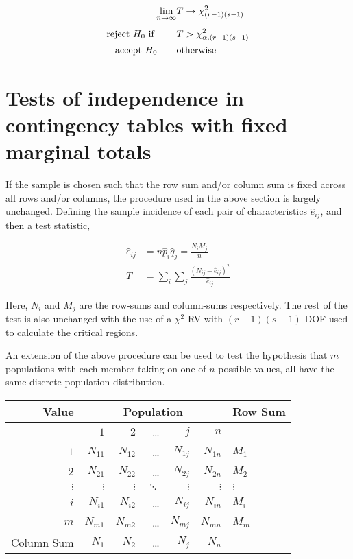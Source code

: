 \begin{align}
	\lim\limits_{n \to \infty} & T \to \chi^2_{(r-1)(s-1)} \\[1ex]
	\text{reject $ H_0 $ if } \qquad & T > \chi^2_{\alpha, (r-1)(s-1)}  \nonumber \\
	\text{accept $ H_0 $} \qquad & \text{otherwise}
\end{align}

\section{Tests of independence in contingency tables with fixed marginal totals}

If the sample is chosen such that the row sum and/or column sum is fixed across all rows and/or columns, the procedure used in the above section is largely unchanged. Defining the sample incidence of each pair of characteristics $ \widehat{e}_{ij} $, and then a test statistic,

\begin{align}
	\widehat{e}_{ij} &= n\widehat{p}_i \widehat{q}_j = \frac{N_i M_j}{n} \\
	T &= \sum_{i} \sum_{j} \frac{(N_{ij} - \widehat{e}_{ij})^2}{\widehat{e}_{ij}}
\end{align}

Here, $ N_i $ and $ M_j $ are the row-sums and column-sums respectively. The rest of the test is also unchanged with the use of a $ \chi^2 $ RV with $ (r-1)(s-1) $ DOF used to calculate the critical regions.


An extension of the above procedure can be used to test the hypothesis that $ m $ populations with each member taking on one of $ n $ possible values, all have the same discrete population distribution.

\begin{table}[H]
	\renewcommand{\arraystretch}{2}
	\centering
	\begin{tabular}{@{}rrrrrr|l@{}}
		\toprule
		Value 	& \multicolumn{5}{c}{Population}	& Row Sum\\ 
		\midrule
		{} & $ 1 $	& $ 2 $	& \dots & $ j $ & $ n $ & {} \\
		\midrule
		$ 1 $ & $ N_{11} $ & $ N_{12} $ & \dots &  $ N_{1j} $ & $ N_{1n} $ & $ M_{1} $ \\
		$ 2 $ & $ N_{21} $ & $ N_{22} $ & \dots &  $ N_{2j} $ & $ N_{2n} $ & $ M_{2} $ \\
		$ \vdots $ & $ \vdots $ & $ \vdots $ & $ \ddots $ &  $ \vdots $ & $ \vdots $ & $ \vdots $ \\
		$ i $ & $ N_{i1} $ & $ N_{i2} $ & \dots &  $ N_{ij} $ & $ N_{in} $ & $ M_{i} $ \\
		$ m $ & $ N_{m1} $ & $ N_{m2} $ & \dots &  $ N_{mj} $ & $ N_{mn} $ & $ M_{m} $ \\
		\midrule
		Column Sum & $ N_1 $ & $ N_2 $ & \dots &  $ N_j $ & $ N_n $ & {} \\ 
		\bottomrule
	\end{tabular}
	
	\bigskip
\end{table}

